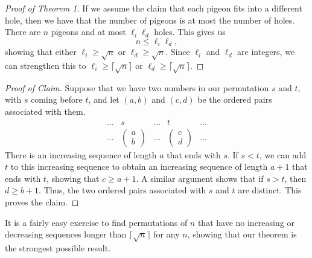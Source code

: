 \documentclass[11pt]{article}
\theoremstyle{plain}
\theoremstyle{definition}
\theoremstyle{remark}
\begin{document}
\begin{proof}[Proof of Theorem 1]
If we assume the claim that each pigeon fits into a different hole, then we have
that the number of pigeons is at most the number of holes. There are $n$
pigeons and at most $\ell_i \ell_d$ holes. This gives us
\[
n \leq \ell_i \ell_d,
\]
showing that either $\ell_i \geq \sqrt{n}$ or $\ell_d \geq
\sqrt{n}$. Since $\ell_i$ and $\ell_d$ are integers, we can strengthen
this to $\ell_i\geq \lceil \sqrt{n}\rceil$ or $\ell_d \geq \lceil
\sqrt{n} \rceil$.  
\end{proof}

\begin{proof}[Proof of Claim] Suppose that we have two numbers in our permutation 
$s$ and $t$, with $s$ coming before $t$, and let $(a,b)$ and $(c,d)$ be the
ordered pairs associated with them.
\[
\begin{array}{ccccc}
\ldots & s & \ldots & t & \ldots\\
\ldots & 
\left(\begin{array}{c}a\\b\end{array}\right) &
\ldots & 
\left(\begin{array}{c}c\\d\end{array}\right) &
\ldots 
\end{array}
\]
There is an increasing sequence of length $a$ that
ends with $s$. 
If $s < t$, we can add $t$ to this increasing sequence to obtain an
increasing sequence of length $a+1$ that ends with $t$, showing that $c \geq
a+1$. A similar argument shows that if $s > t$, then $d \geq b+1$. Thus,
the two ordered pairs associated with $s$ and $t$ are distinct.  This proves
the claim.
\end{proof}

It is a fairly easy exercise to find permutations of $n$ 
that have no increasing or decreasing sequences longer than $\lceil \sqrt{n}
\rceil$ for any $n$, showing that our theorem is the strongest possible result.
\end{document}
